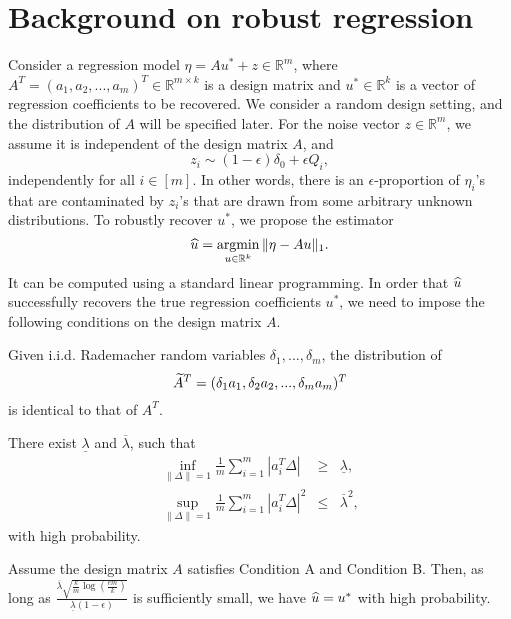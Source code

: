 


\section{Background on robust regression}
\label{sec:regression}

Consider a regression model $\eta=Au^*+z\in\mathbb{R}^m$, where $A^T=(a_1,a_2,...,a_m)^T\in\mathbb{R}^{m\times k}$ is a design matrix and $u^*\in\mathbb{R}^k$ is a vector of regression coefficients to be recovered. We consider a random design setting, and the distribution of $A$ will be specified later. For the noise vector $z\in\mathbb{R}^m$, we assume it is independent of the design matrix $A$, and
\begin{equation}
z_i\sim (1-\epsilon)\delta_0 + \epsilon Q_i, \label{eq:noise-add-con}
\end{equation}
independently for all $i\in[m]$. In other words, there is an $\epsilon$-proportion of $\eta_i$'s that are contaminated by $z_i$'s that are drawn from some arbitrary unknown distributions. To robustly recover $u^*$, we propose the estimator
$$\widehat{u}=\mathop{\rm argmin}_{u\in\mathbb{R}^k}\|\eta-Au\|_1.$$
It can be computed using a standard linear programming.
In order that $\widehat{u}$ successfully recovers the true regression coefficients $u^*$, we need to impose the following conditions on the design matrix $A$.
\begin{con1}
Given i.i.d. Rademacher random variables $\delta_1,...,\delta_m$, the distribution of
$$\widetilde{A}^T=(\delta_1a_1,\delta_2a_2,...,\delta_ma_m)^T$$ 
is identical to that of $A^T$.
\end{con1}
\begin{con2}
There exist $\underline{\lambda}$ and $\overline{\lambda}$, such that
\begin{eqnarray}
\label{eq:l1-upper-A} \inf_{\|\Delta\|=1}\frac{1}{m}\sum_{i=1}^m|a_i^T\Delta| &\geq& \underline{\lambda}, \\
\label{eq:l2-upper-A} \sup_{\|\Delta\|=1}\frac{1}{m}\sum_{i=1}^m|a_i^T\Delta|^2 &\leq& \overline{\lambda}^2,
\end{eqnarray}
with high probability.
\end{con2}
\begin{thm}\label{thm:robust-reg}
Assume the design matrix $A$ satisfies Condition A and Condition B. Then, as long as $\frac{\overline{\lambda}\sqrt{\frac{k}{m}\log\left(\frac{em}{k}\right)}}{\underline{\lambda}(1-\epsilon)}$ is sufficiently small, we have $\widehat{u}=u^*$ with high probability.
\end{thm}


